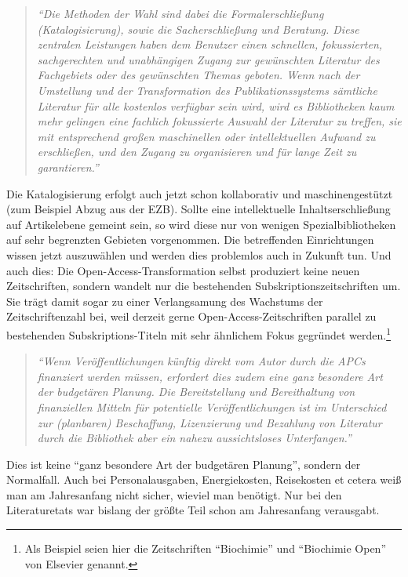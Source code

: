 \documentclass[a4paper,
fontsize=11pt,
oneside,
numbers=noperiodatend,
parskip=half-,
bibliography=totoc,
final
]{scrartcl}
\begin{document}
\begin{quote}
\emph{\enquote{Die Methoden der Wahl sind dabei die Formalerschließung
(Katalogisierung), sowie die Sacherschließung und Beratung. Diese
zentralen Leistungen haben dem Benutzer einen schnellen, fokussierten,
sachgerechten und unabhängigen Zugang zur gewünschten Literatur des
Fachgebiets oder des gewünschten Themas geboten. Wenn nach der
Umstellung und der Transformation des Publikationssystems sämtliche
Literatur für alle kostenlos verfügbar sein wird, wird es Bibliotheken
kaum mehr gelingen eine fachlich fokussierte Auswahl der Literatur zu
treffen, sie mit entsprechend großen maschinellen oder intellektuellen
Aufwand zu erschließen, und den Zugang zu organisieren und für lange
Zeit zu garantieren.}}
\end{quote}

Die Katalogisierung erfolgt auch jetzt schon kollaborativ und
maschinengestützt (zum Beispiel Abzug aus der EZB). Sollte eine
intellektuelle Inhaltserschließung auf Artikelebene gemeint sein, so
wird diese nur von wenigen Spezialbibliotheken auf sehr begrenzten
Gebieten vorgenommen. Die betreffenden Einrichtungen wissen jetzt
auszuwählen und werden dies problemlos auch in Zukunft tun. Und auch
dies: Die Open-Access-Transformation selbst produziert keine neuen
Zeitschriften, sondern wandelt nur die bestehenden
Subskriptionszeitschriften um. Sie trägt damit sogar zu einer
Verlangsamung des Wachstums der Zeitschriftenzahl bei, weil derzeit
gerne Open-Access-Zeitschriften parallel zu bestehenden
Subskriptions-Titeln mit sehr ähnlichem Fokus gegründet
werden.\footnote{Als Beispiel seien hier die Zeitschriften
  \enquote{Biochimie} und \enquote{Biochimie Open} von Elsevier genannt.}

\begin{quote}
\emph{\enquote{Wenn Veröffentlichungen künftig direkt vom Autor durch
die APCs finanziert werden müssen, erfordert dies zudem eine ganz
besondere Art der budgetären Planung. Die Bereitstellung und
Bereithaltung von finanziellen Mitteln für potentielle
Veröffentlichungen ist im Unterschied zur (planbaren) Beschaffung,
Lizenzierung und Bezahlung von Literatur durch die Bibliothek aber ein
nahezu aussichtsloses Unterfangen.}}
\end{quote}

Dies ist keine \enquote{ganz besondere Art der budgetären Planung},
sondern der Normalfall. Auch bei Personalausgaben, Energiekosten,
Reisekosten et cetera weiß man am Jahresanfang nicht sicher, wieviel man
benötigt. Nur bei den Literaturetats war bislang der größte Teil schon
am Jahresanfang verausgabt.
\end{document}
